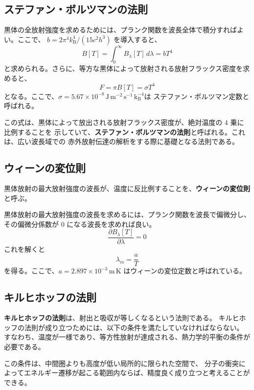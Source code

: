 \documentclass[article,twoside]{dennou777}
\newcommand{\hmunit}[1]{\,\mathrm{#1}}
\newcommand{\hmemph}[1]{\textbf{#1}}
\begin{document}
\subsection{ステファン・ボルツマンの法則}
黒体の全放射強度を求めるためには、プランク関数を波長全体で積分すればよい。ここで、
$b=2\pi^4k_\mathrm{B}^4/(15c^2h^3)$ を導入すると、
\begin{equation}
	B[T]=\int^\infty_0 B_\lambda[T]\,d\lambda=bT^4
\end{equation}
と求められる。さらに、等方な黒体によって放射される放射フラックス密度を求めると、
\begin{equation}
	F=\pi B[T]=\sigma T^4
\end{equation}
となる。ここで、$\sigma=5.67\times10^{-8}\hmunit{J\,m^{-2}\,s^{-1}\,k_\mathrm{B}^{-4}}$は
ステファン・ボルツマン定数と呼ばれる。

この式は、黒体によって放出される放射フラックス密度が、絶対温度の $4$ 乗に比例することを
示していて、\hmemph{ステファン・ボルツマンの法則}と呼ばれる。これは、広い波長域での
赤外放射伝達の解析をする際に基礎となる法則である。

\subsection{ウィーンの変位則}
黒体放射の最大放射強度の波長が、温度に反比例することを、\hmemph{ウィーンの変位則}と呼ぶ。

黒体放射の最大放射強度の波長を求めるには、プランク関数を波長で偏微分し、その偏微分係数が
$0$ になる波長を求めれば良い。
\begin{equation}
	\frac{\partial B_\lambda[T]}{\partial\lambda}=0
\end{equation}
これを解くと
\begin{equation}
	\lambda_m=\frac{a}{T}
\end{equation}
を得る。ここで、$a=2.897\times10^{-3}\hmunit{m\,K}$ はウィーンの変位定数と呼ばれている。

\subsection{キルヒホッフの法則}
\hmemph{キルヒホッフの法則}は、射出と吸収が等しくなるという法則である。
キルヒホッフの法則が成り立つためには、以下の条件を満たしていなければならない。
すなわち、温度が一様であり、等方性放射が達成される、熱力学的平衡の条件が必要である。

この条件は、中間圏よりも高度が低い局所的に限られた空間で、
分子の衝突によってエネルギー遷移が起こる範囲内ならば、精度良く成り立つと考えることができる。
\end{document}
